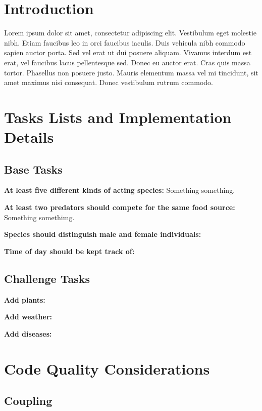 \documentclass[12pt, a4paper]{scrartcl}
\begin{document}
\begin{multicols}{2}


\section{Introduction}

Lorem ipsum dolor sit amet, consectetur adipiscing elit. Vestibulum eget molestie nibh. Etiam faucibus leo in orci faucibus iaculis. Duis vehicula nibh commodo sapien auctor porta. Sed vel erat ut dui posuere aliquam. Vivamus interdum est erat, vel faucibus lacus pellentesque sed. Donec eu auctor erat. Cras quis massa tortor. Phasellus non posuere justo. Mauris elementum massa vel mi tincidunt, sit amet maximus nisi consequat. Donec vestibulum rutrum commodo.

\section{Tasks Lists and Implementation Details}

\subsection{Base Tasks}

  \noindent \textbf{At least five different kinds of acting species:} Something something.
  
  \noindent \textbf{At least two predators should compete for the same food source:} Something somethimg.
  
  \noindent \textbf{Species should distinguish male and female individuals:}
  
  \noindent \textbf{Time of day should be kept track of:}

\subsection{Challenge Tasks}

  \noindent \textbf{Add plants:}
  
  \noindent \textbf{Add weather:}
  
  \noindent \textbf{Add diseases:}

\section{Code Quality Considerations}

\subsection{Coupling}


\end{multicols}
\end{document}

